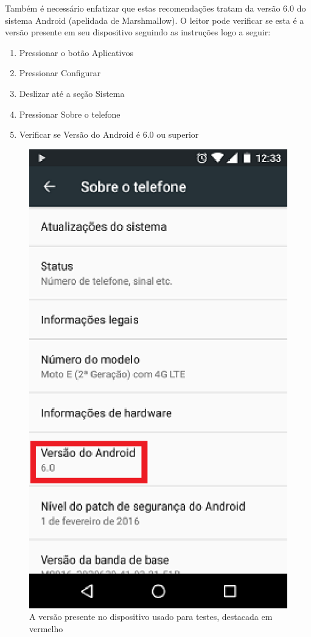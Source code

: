 Tamb\'em \'e necess\'ario enfatizar que estas recomenda\c c\~oes tratam da vers\~ao 6.0 do sistema Android (apelidada de Marshmallow). O leitor pode verificar se esta \'e a vers\~ao presente em seu dispositivo seguindo as instru\c c\~oes logo a seguir:

\begin{enumerate}
\item Pressionar o bot\~ao Aplicativos
\item Pressionar Configurar
\item Deslizar at\'e a se\c c\~ao Sistema
\item Pressionar Sobre o telefone
\item Verificar se Vers\~ao do Android \'e 6.0 ou superior
\end{enumerate}

\begin{figure}[h]
	\centering
	\includegraphics{imagem2.eps}
	\caption{A vers\~ao presente no dispositivo usado para testes, destacada em vermelho}
\end{figure}

